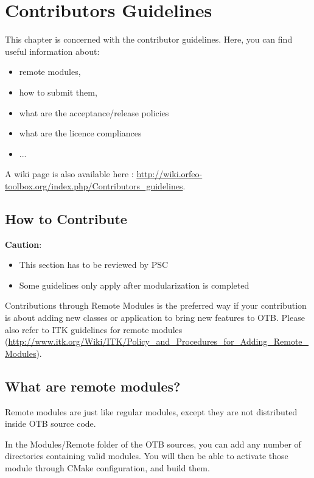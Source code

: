 \chapter{Contributors Guidelines}
\label{chapter:Contribute}

This chapter is concerned with the contributor guidelines.
Here, you can find useful information about:
\begin{itemize}
       \item remote modules, 
       \item how to submit them,
       \item what are the acceptance/release policies
       \item what are the licence compliances
       \item ...
\end{itemize}

A wiki page is also available here : \url{http://wiki.orfeo-toolbox.org/index.php/Contributors_guidelines}.

\section{How to Contribute}

\textbf{Caution}: 
\begin{itemize}
       \item  This section has to be reviewed by PSC
       \item  Some guidelines only apply after modularization is completed 
\end{itemize}

Contributions through Remote Modules is the preferred way if your contribution is about adding new classes or application to bring new features to OTB. 
Please also refer to ITK guidelines for remote modules (\url{http://www.itk.org/Wiki/ITK/Policy_and_Procedures_for_Adding_Remote_Modules}).

\section{What are remote modules?}

Remote modules are just like regular modules, except they are not distributed inside OTB source code.

In the Modules/Remote folder of the OTB sources, you can add any number of directories containing valid modules. You will then be able to activate those module through CMake configuration, and build them.

